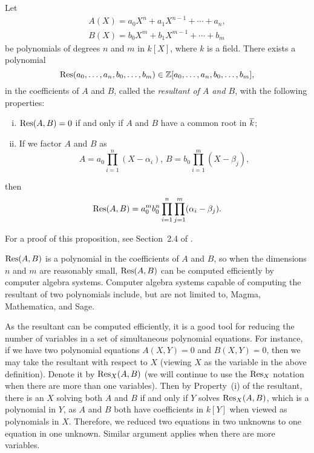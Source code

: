 \begin{proposition}
  \label{prop:res}
  Let
  \[
  \begin{gathered}
    A(X) = a_0 X^n + a_1 X^{n-1} + \cdots + a_n,\\
    B(X) = b_0 X^m + b_1 X^{m-1} + \cdots + b_m
  \end{gathered}
  \]
  be polynomials of degrees $n$ and $m$ in $k[X]$, where $k$ is a
  field. There exists a polynomial
  \[
  \mathrm{Res}(a_0, \dots, a_n, b_0, \dots, b_m) \in \mathbb{Z}[a_0, \dots, a_n, b_0,
  \dots, b_m],
  \]
  in the coefficients of $A$ and $B$, called the \emph{resultant of
    $A$ and $B$}, with the following properties:
  \begin{enumerate}[(i)]
  \item $\mathrm{Res}(A, B) = 0$ if and only if $A$ and $B$ have a common root
    in $\overline{k}$;

  \item If we factor $A$ and $B$ as
    \[
    A = a_0 \prod_{i=1}^n (X - \alpha_i),\,
    B = b_0 \prod_{i=1}^m (X - \beta_j),
    \]
  \end{enumerate}
  then
  \[
  \mathrm{Res}(A, B) = a_0^m b_0^n \prod_{i=1}^n \prod_{j=1}^m (\alpha_i -
  \beta_j).
  \]
\end{proposition}

For a proof of this proposition, see Section~2.4 of \cite{MR2316407}.

\begin{remark}
  $\mathrm{Res}(A, B)$ is a polynomial in the coefficients of $A$ and $B$, so
  when the dimensions $n$ and $m$ are reasonably small, $\mathrm{Res}(A, B)$
  can be computed efficiently by computer algebra systems. Computer
  algebra systems capable of computing the resultant of two
  polynomials include, but are not limited to, Magma, Mathematica, and
  Sage.

  As the resultant can be computed efficiently, it is a good tool for
  reducing the number of variables in a set of simultaneous polynomial
  equations. For instance, if we have two polynomial equations $A(X,
  Y) = 0$ and $B(X, Y) = 0$, then we may take the resultant with
  respect to $X$ (viewing $X$ as the variable in the above
  definition). Denote it by $\mathrm{Res}_X(A, B)$ (we will continue to use
  the $\mathrm{Res}_X$ notation when there are more than one variables). Then
  by Property~(i) of the resultant, there is an $X$ solving both $A$
  and $B$ if and only if $Y$ solves $\mathrm{Res}_X(A, B)$, which is a
  polynomial in $Y$, as $A$ and $B$ both have coefficients in $k[Y]$
  when viewed as polynomials in $X$. Therefore, we reduced two
  equations in two unknowns to one equation in one unknown. Similar
  argument applies when there are more variables.
\end{remark}

